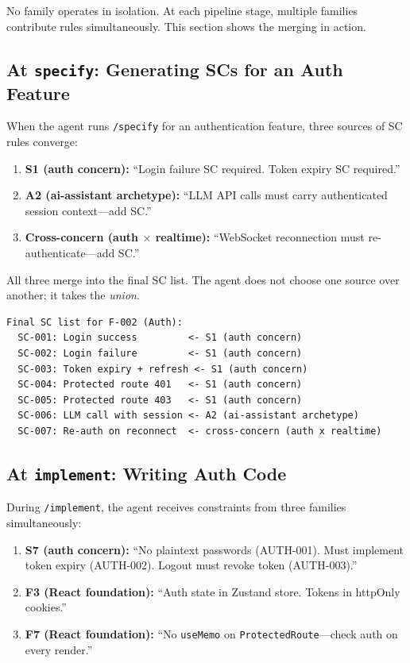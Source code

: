\documentclass[11pt,a4paper,openright,twoside]{report}
\newcommand{\cmd}[1]{\texttt{/#1}}
\begin{document}
No family operates in isolation. At each pipeline stage, multiple families contribute rules simultaneously. This section shows the merging in action.

\subsection{At \texttt{specify}: Generating SCs for an Auth Feature}

When the agent runs \cmd{specify} for an authentication feature, three sources of SC rules converge:

\begin{enumerate}[nosep]
  \item \textbf{S1 (auth concern):} ``Login failure SC required. Token expiry SC required.''
  \item \textbf{A2 (ai-assistant archetype):} ``LLM API calls must carry authenticated session context---add SC.''
  \item \textbf{Cross-concern (auth $\times$ realtime):} ``WebSocket reconnection must re-authenticate---add SC.''
\end{enumerate}

All three merge into the final SC list. The agent does not choose one source over another; it takes the \emph{union}.

\begin{patternbox}
\begin{lstlisting}
Final SC list for F-002 (Auth):
  SC-001: Login success         <- S1 (auth concern)
  SC-002: Login failure         <- S1 (auth concern)
  SC-003: Token expiry + refresh <- S1 (auth concern)
  SC-004: Protected route 401   <- S1 (auth concern)
  SC-005: Protected route 403   <- S1 (auth concern)
  SC-006: LLM call with session <- A2 (ai-assistant archetype)
  SC-007: Re-auth on reconnect  <- cross-concern (auth x realtime)
\end{lstlisting}
\end{patternbox}

\subsection{At \texttt{implement}: Writing Auth Code}

During \cmd{implement}, the agent receives constraints from three families simultaneously:

\begin{enumerate}[nosep]
  \item \textbf{S7 (auth concern):} ``No plaintext passwords (AUTH-001). Must implement token expiry (AUTH-002). Logout must revoke token (AUTH-003).''
  \item \textbf{F3 (React foundation):} ``Auth state in Zustand store. Tokens in httpOnly cookies.''
  \item \textbf{F7 (React foundation):} ``No \texttt{useMemo} on \texttt{ProtectedRoute}---check auth on every render.''
\end{enumerate}
\end{document}
